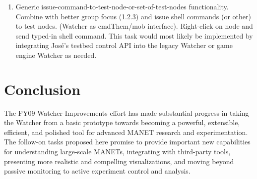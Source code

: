 \documentclass{report}
\begin{document}
\begin{enumerate}
\begin{enumerate}
    \item Generic issue-command-to-test-node-or-set-of-test-nodes functionality. Combine with better group focus (1.2.3) and issue shell commands (or other) to test nodes. (Watcher as cmdThem\slash mob interface). Right-click on node and send typed-in shell command. This task would most likely be implemented by integrating Jos\'{e}'s testbed control API into the legacy Watcher or game engine Watcher as needed. 
\end{enumerate}
\end{enumerate}

\section{Conclusion}

The FY09 Watcher Improvements effort has made substantial progress
in taking the Watcher from a basic prototype towards becoming a
powerful, extensible, efficient, and polished tool for advanced MANET
research and experimentation.  The follow-on tasks proposed here
promise to provide important new capabilities for understanding
large-scale MANETs, integrating with third-party tools, presenting 
more realistic and compelling visualizations, and moving beyond passive 
monitoring to active experiment control and analysis. 
\end{document}
